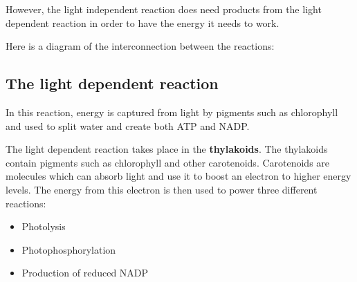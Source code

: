 \documentclass{article}
\begin{document}
However, the light independent reaction does need products from the light dependent reaction in order to have the energy it needs to work.

Here is a diagram of the interconnection between the reactions:

\begin{center}
\end{center}

\subsection*{The light dependent reaction}
In this reaction, energy is captured from light by pigments such as chlorophyll and used to split water and create both ATP and NADP.

The light dependent reaction takes place in the \textbf{thylakoids}. The thylakoids contain pigments such as chlorophyll and other carotenoids. Carotenoids are molecules which can absorb light and use it to boost an electron to higher energy levels. The energy from this electron is then used to power three different reactions:
\begin {itemize}
 \item Photolysis
 \item Photophosphorylation
 \item Production of reduced NADP
\end{itemize}

\newpage
\end{document}
